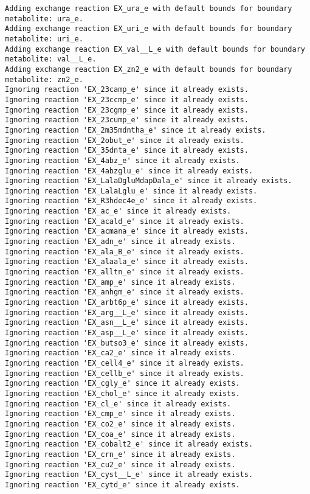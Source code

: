 \documentclass[
  letterpaper,
  DIV=11,
  numbers=noendperiod]{scrartcl}
\begin{document}
\begin{verbatim}
Adding exchange reaction EX_ura_e with default bounds for boundary metabolite: ura_e.
Adding exchange reaction EX_uri_e with default bounds for boundary metabolite: uri_e.
Adding exchange reaction EX_val__L_e with default bounds for boundary metabolite: val__L_e.
Adding exchange reaction EX_zn2_e with default bounds for boundary metabolite: zn2_e.
Ignoring reaction 'EX_23camp_e' since it already exists.
Ignoring reaction 'EX_23ccmp_e' since it already exists.
Ignoring reaction 'EX_23cgmp_e' since it already exists.
Ignoring reaction 'EX_23cump_e' since it already exists.
Ignoring reaction 'EX_2m35mdntha_e' since it already exists.
Ignoring reaction 'EX_2obut_e' since it already exists.
Ignoring reaction 'EX_35dnta_e' since it already exists.
Ignoring reaction 'EX_4abz_e' since it already exists.
Ignoring reaction 'EX_4abzglu_e' since it already exists.
Ignoring reaction 'EX_LalaDgluMdapDala_e' since it already exists.
Ignoring reaction 'EX_LalaLglu_e' since it already exists.
Ignoring reaction 'EX_R3hdec4e_e' since it already exists.
Ignoring reaction 'EX_ac_e' since it already exists.
Ignoring reaction 'EX_acald_e' since it already exists.
Ignoring reaction 'EX_acmana_e' since it already exists.
Ignoring reaction 'EX_adn_e' since it already exists.
Ignoring reaction 'EX_ala_B_e' since it already exists.
Ignoring reaction 'EX_alaala_e' since it already exists.
Ignoring reaction 'EX_alltn_e' since it already exists.
Ignoring reaction 'EX_amp_e' since it already exists.
Ignoring reaction 'EX_anhgm_e' since it already exists.
Ignoring reaction 'EX_arbt6p_e' since it already exists.
Ignoring reaction 'EX_arg__L_e' since it already exists.
Ignoring reaction 'EX_asn__L_e' since it already exists.
Ignoring reaction 'EX_asp__L_e' since it already exists.
Ignoring reaction 'EX_butso3_e' since it already exists.
Ignoring reaction 'EX_ca2_e' since it already exists.
Ignoring reaction 'EX_cell4_e' since it already exists.
Ignoring reaction 'EX_cellb_e' since it already exists.
Ignoring reaction 'EX_cgly_e' since it already exists.
Ignoring reaction 'EX_chol_e' since it already exists.
Ignoring reaction 'EX_cl_e' since it already exists.
Ignoring reaction 'EX_cmp_e' since it already exists.
Ignoring reaction 'EX_co2_e' since it already exists.
Ignoring reaction 'EX_coa_e' since it already exists.
Ignoring reaction 'EX_cobalt2_e' since it already exists.
Ignoring reaction 'EX_crn_e' since it already exists.
Ignoring reaction 'EX_cu2_e' since it already exists.
Ignoring reaction 'EX_cyst__L_e' since it already exists.
Ignoring reaction 'EX_cytd_e' since it already exists.

\end{verbatim}
\end{document}
